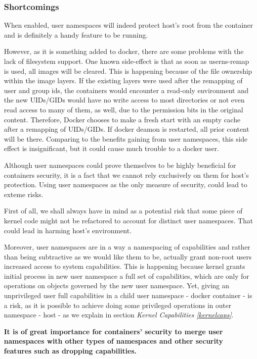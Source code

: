 \subsubsection{Shortcomings}
When enabled, user namespaces will indeed protect host's root from the container and is definitely a handy feature to be running.

However, as it is something  added to docker, there are some problems with the lack of filesystem support. One known side-effect is that as soon as userns-remap is used, all images will be cleared. This is happening because of the file ownership within the image layers. If the existing layers were used after the remapping of user and group ids, the containers would encounter a read-only environment and the new UIDs/GIDs would have no write access to most directories or not even read access to many of them, as well, due to the permission bits in the original content. Therefore, Docker chooses to make a fresh start with an empty cache after a remapping of UIDs/GIDs. If docker deamon is restarted, all prior content will be there. Comparing to the benefits gaining from user namespaces, this side effect is insignificant, but it could cause much trouble to a docker user.

Although user namespaces could prove themselves to be highly beneficial for containers security, it is a fact that we cannot rely exclusively on them for host's protection. Using user namespaces as the only measure of security, could lead to exteme risks.

First of all, we shall always have in mind as a potential risk that some piece of kernel code might not be refactored to account for distinct user namespaces. That could lead in harming host's environment.

Moreover, user namespaces are in a way a namespacing of capabilities and rather than being subtractive as we would like them to be, actually grant non-root users increased access to system capabilities. This is happening because kernel grants initial process in new user namespace a full set of capabilities, which are only for operations on objects governed by the new user namespace. Yet, giving an unprivileged user full capabilities in a child user namespace - docker container - is a risk, as it is possible to achieve doing some privileged operations in outer namespace - host - as we explain in section \textit{Kernel Capabilities \ref{kernelcaps}}. \cite{usernsnotsosecure}

\textbf{It is of great importance for containers' security to merge user namespaces with other types of namespaces and other security features such as dropping capabilities.}
\hfill\break

